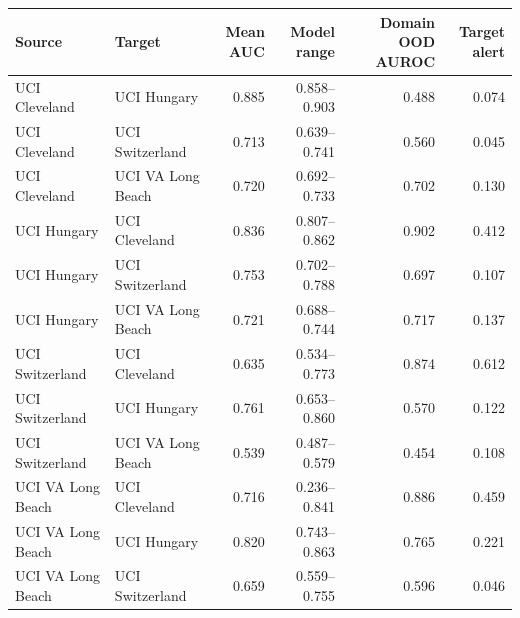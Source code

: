\begin{tabular}{llrrrr}
\toprule
Source & Target & Mean AUC & Model range & Domain OOD AUROC & Target alert \\
\midrule
UCI Cleveland & UCI Hungary & 0.885 & 0.858--0.903 & 0.488 & 0.074 \\
UCI Cleveland & UCI Switzerland & 0.713 & 0.639--0.741 & 0.560 & 0.045 \\
UCI Cleveland & UCI VA Long Beach & 0.720 & 0.692--0.733 & 0.702 & 0.130 \\
UCI Hungary & UCI Cleveland & 0.836 & 0.807--0.862 & 0.902 & 0.412 \\
UCI Hungary & UCI Switzerland & 0.753 & 0.702--0.788 & 0.697 & 0.107 \\
UCI Hungary & UCI VA Long Beach & 0.721 & 0.688--0.744 & 0.717 & 0.137 \\
UCI Switzerland & UCI Cleveland & 0.635 & 0.534--0.773 & 0.874 & 0.612 \\
UCI Switzerland & UCI Hungary & 0.761 & 0.653--0.860 & 0.570 & 0.122 \\
UCI Switzerland & UCI VA Long Beach & 0.539 & 0.487--0.579 & 0.454 & 0.108 \\
UCI VA Long Beach & UCI Cleveland & 0.716 & 0.236--0.841 & 0.886 & 0.459 \\
UCI VA Long Beach & UCI Hungary & 0.820 & 0.743--0.863 & 0.765 & 0.221 \\
UCI VA Long Beach & UCI Switzerland & 0.659 & 0.559--0.755 & 0.596 & 0.046 \\
\bottomrule
\end{tabular}
